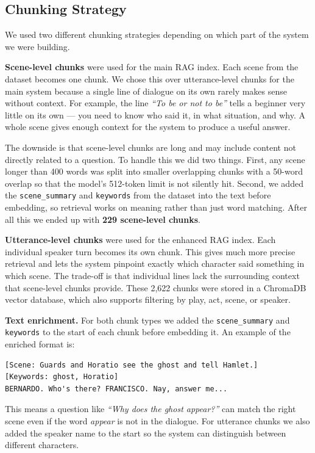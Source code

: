 \documentclass[10pt,conference]{IEEEtran}
\begin{document}
\subsection{Chunking Strategy}

We used two different chunking strategies depending on which part
of the system we were building.

\textbf{Scene-level chunks} were used for the main RAG index. Each
scene from the dataset becomes one chunk. We chose this over
utterance-level chunks for the main system because a single line of
dialogue on its own rarely makes sense without context. For example,
the line \textit{``To be or not to be''} tells a beginner very
little on its own --- you need to know who said it, in what
situation, and why. A whole scene gives enough context for the
system to produce a useful answer.

The downside is that scene-level chunks are long and may include
content not directly related to a question. To handle this we did
two things. First, any scene longer than 400 words was split into
smaller overlapping chunks with a 50-word overlap so that the
model's 512-token limit is not silently hit. Second, we added the
\texttt{scene\_summary} and \texttt{keywords} from the dataset into
the text before embedding, so retrieval works on meaning rather than
just word matching. After all this we ended up with
\textbf{229 scene-level chunks}.

\textbf{Utterance-level chunks} were used for the enhanced RAG
index. Each individual speaker turn becomes its own chunk. This
gives much more precise retrieval and lets the system pinpoint
exactly which character said something in which scene. The
trade-off is that individual lines lack the surrounding context
that scene-level chunks provide. These 2{,}622 chunks were stored in
a ChromaDB vector database, which also supports filtering by play,
act, scene, or speaker.

\textbf{Text enrichment.} For both chunk types we added the
\texttt{scene\_summary} and \texttt{keywords} to the start of each
chunk before embedding it. An example of the enriched format is:

\begin{lstlisting}
[Scene: Guards and Horatio see the ghost and tell Hamlet.]
[Keywords: ghost, Horatio]
BERNARDO. Who's there? FRANCISCO. Nay, answer me...
\end{lstlisting}

This means a question like \textit{``Why does the ghost appear?''}
can match the right scene even if the word \textit{appear} is not
in the dialogue. For utterance chunks we also added the speaker
name to the start so the system can distinguish between different
characters.
\end{document}
